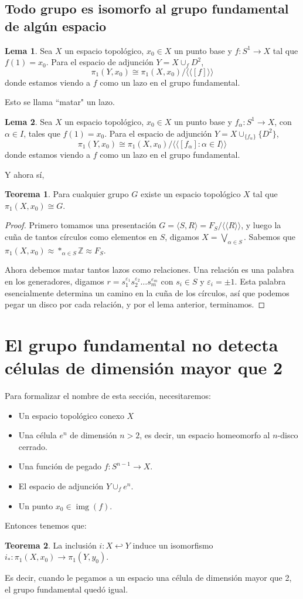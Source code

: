 \documentclass[spanish]{book}
\theoremstyle{definition}
\newtheorem*{lema}{Lema}
\newtheorem*{teo}{Teorema}
\newcommand{\Z}{\mathbb{Z}}
\DeclareMathOperator{\img}{img}
\begin{document}
\subsection{Todo grupo es isomorfo al grupo fundamental de algún espacio}
	\begin{lema}
		Sea $X$ un espacio topológico, $x_0\in X$ un punto base y $f:S^1\to X$ tal que $f(1)=x_0$. Para el espacio de adjunción $Y=X\cup_f D^2$,
		\[\pi_1(Y,x_0)\cong\pi_1(X,x_0)\big/\langle\langle [f]\rangle\rangle\]
		donde estamos viendo a $f$ como un lazo en el grupo fundamental.
	\end{lema}
	Esto se llama ``matar" un lazo.
	\begin{lema}
		Sea $X$ un espacio topológico, $x_0\in X$ un punto base y $f_\alpha:S^1\to X$, con $\alpha\in I$, tales que $f(1)=x_0$. Para el espacio de adjunción $Y=X\cup_{\{f_\alpha\}} \{D^2\}$,
		\[\pi_1(Y,x_0)\cong\pi_1(X,x_0)\big/\langle\langle [f_\alpha]:\alpha\in I\rangle\rangle\]
		donde estamos viendo a $f$ como un lazo en el grupo fundamental.
	\end{lema}
	Y ahora sí,
	\begin{teo}
		Para cualquier grupo $G$ existe un espacio topológico $X$ tal que $\pi_1(X,x_0)\cong G$.
	\end{teo}
	\begin{proof}
		Primero tomamos una presentación  $G=\langle S,R\rangle=F_S/\langle\langle R\rangle\rangle$, y luego la cuña de tantos círculos como elementos en $S$, digamos $X=\bigvee_{\alpha\in S}$. Sabemos que $\pi_1(X,x_0)\approx *_{\alpha\in S}\Z\approx F_S$.
		
		Ahora debemos matar tantos lazos como relaciones. Una relación es una palabra en los generadores, digamos $r=s_1^{\varepsilon_1}s_2^{\varepsilon_2}\ldots s_m^{\varepsilon_m}$ con $s_i\in S$ y $\varepsilon_i=\pm1$. Esta palabra esencialmente determina un camino en la cuña de los círculos, así que podemos pegar un disco por cada relación, y por el lema anterior, terminamos.
	\end{proof}
	
\section{El grupo fundamental no detecta células de dimensión mayor que 2}
	Para formalizar el nombre de esta sección, necesitaremos: 
	\begin{itemize}
		\item Un espacio topológico conexo $X$
		\item Una célula $e^n$ de dimensión $n>2$, es decir, un espacio homeomorfo al $n$-disco cerrado.
		\item Una función de pegado $f:S^{n-1}\to X$.
		\item El espacio de adjunción $Y\cup_f e^n$.
		\item Un punto $x_0\in\img(f)$.
	\end{itemize}
	Entonces tenemos que:
	\begin{teo}
		La inclusión $i:X\hookleftarrow Y$ induce un isomorfismo $i_*:\pi_1(X,x_0)\to\pi_1(Y,y_0)$.
	\end{teo}
	Es decir, cuando le pegamos a un espacio una célula de dimensión mayor que 2, el grupo fundamental quedó igual.
\end{document}
